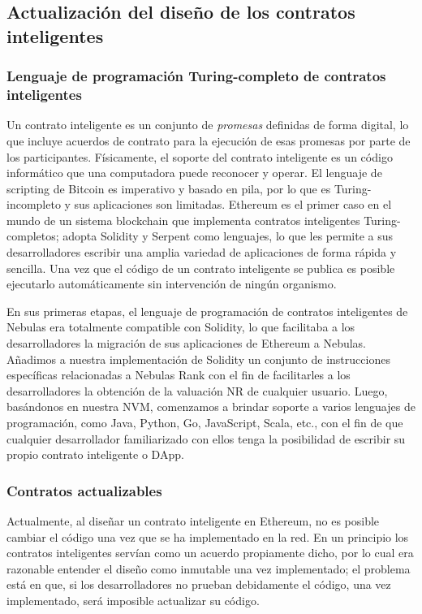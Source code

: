 \subsection{Actualización del diseño de los contratos inteligentes}

\subsubsection{Lenguaje de programación Turing-completo de contratos inteligentes}

Un contrato inteligente es un conjunto de \textit{promesas} definidas de forma digital, lo que incluye acuerdos de contrato para la ejecución de esas promesas por parte de los participantes. Físicamente, el soporte del contrato inteligente es un código informático que una computadora puede reconocer y operar. El lenguaje de scripting de Bitcoin es imperativo y basado en pila, por lo que es Turing-incompleto y sus aplicaciones son limitadas. Ethereum es el primer caso en el mundo de un sistema blockchain que implementa contratos inteligentes Turing-completos; adopta Solidity y Serpent como lenguajes, lo que les permite a sus desarrolladores escribir una amplia variedad de aplicaciones de forma rápida y sencilla. Una vez que el código de un contrato inteligente se publica es posible ejecutarlo automáticamente sin intervención de ningún organismo.

En sus primeras etapas, el lenguaje de programación de contratos inteligentes de Nebulas era totalmente compatible con Solidity, lo que facilitaba a los desarrolladores la migración de sus aplicaciones de Ethereum a Nebulas. Añadimos a nuestra implementación de Solidity un conjunto de instrucciones específicas relacionadas a Nebulas Rank con el fin de facilitarles a los desarrolladores la obtención de la valuación NR de cualquier usuario. Luego, basándonos en nuestra NVM, comenzamos a brindar soporte a varios lenguajes de programación, como Java, Python, Go, JavaScript, Scala, etc., con el fin de que cualquier desarrollador familiarizado con ellos tenga la posibilidad de escribir su propio contrato inteligente o DApp.

\subsubsection{Contratos actualizables}

Actualmente, al diseñar un contrato inteligente en Ethereum, no es posible cambiar el código una vez que se ha implementado en la red. En un principio los contratos inteligentes servían como un acuerdo propiamente dicho, por lo cual era razonable entender el diseño como inmutable una vez implementado; el problema está en que, si los desarrolladores no prueban debidamente el código, una vez implementado, será imposible actualizar su código.

